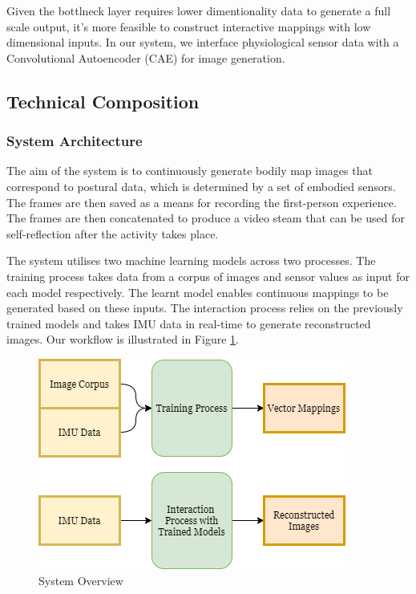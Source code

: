 Given the bottlneck layer requires lower dimentionality data to generate a full scale output, it's more feasible to construct interactive mappings with low dimensional inputs. In our system, we interface physiological sensor data with a Convolutional Autoencoder (CAE) for image generation.

\subsection{Technical Composition}

\subsubsection{System Architecture}

The aim of the system is to continuously generate bodily map images that correspond to postural data, which is determined by a set of embodied sensors. The frames are then saved as a means for recording the first-person experience. The frames are then concatenated to produce a video steam that can be used for self-reflection after the activity takes place.

The system utilises two machine learning models across two processes. The training process takes data from a corpus of images and sensor values as input for each model respectively. The learnt model enables continuous mappings to be generated based on these inputs. The interaction process relies on the previously trained models and takes IMU data in real-time to generate reconstructed images. Our workflow is illustrated in Figure \ref{fig:system_overview}.

\begin{figure}[ht]
    \centering
    \includegraphics[width=\textwidth]{Chapters/Figures/modi_dis/Latent-Steps-Architecture.png}
    \caption{System Overview}
    \label{fig:system_overview}
\end{figure}

